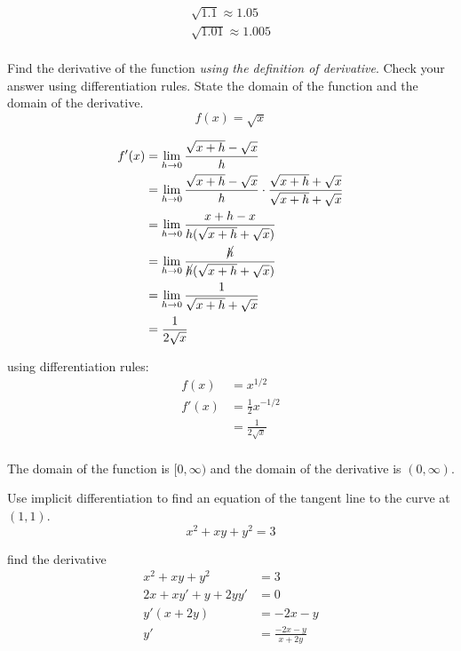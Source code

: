 \documentclass[fleqn,addpoints]{exam}
\begin{document}
\begin{questions}
\begin{solution}
\begin{align*}
  \sqrt{1.1} \approx 1.05 \\
  \sqrt{1.01} \approx 1.005 \\
\end{align*}

\end{solution}

\ifprintanswers
\pagebreak
\fi

\question Find the derivative of the function {\em using the definition of derivative}. Check your answer using
differentiation rules. State the domain of the function and the domain of the derivative.
\[
  f(x) = \sqrt{x}
\]

\begin{solution}
\begin{align*}
  f'(x) &= \lim_{h \to 0} \frac{\sqrt{x + h} - \sqrt{x}}{h} \\
        &= \lim_{h \to 0} \frac{\sqrt{x + h} - \sqrt{x}}{h} \cdot \frac{\sqrt{x + h} + \sqrt{x}}{\sqrt{x + h} + \sqrt{x}} \\
        &= \lim_{h \to 0} \frac{x + h - x}{h (\sqrt{x + h} + \sqrt{x})} \\
        &= \lim_{h \to 0} \frac{\cancel{h}}{\cancel{h} (\sqrt{x + h} + \sqrt{x})} \\
        &= \lim_{h \to 0} \frac{1}{\sqrt{x + h} + \sqrt{x}} \\
        &= \frac{1}{2 \sqrt{x}} \\
\end{align*}

using differentiation rules:
\begin{align*}
  f(x) &= x^{1/2} \\
  f'(x) &= \frac{1}{2} x^{-1/2} \\
        &= \frac{1}{2 \sqrt{x}} \\
\end{align*}

The domain of the function is $[0, \infty)$ and the domain of the derivative is $(0, \infty)$.

\end{solution}

\ifprintanswers
\pagebreak
\fi

\question Use implicit differentiation to find an equation of the tangent line to the curve at $(1, 1)$.
\[
  x^2 + xy + y^2 = 3
\]
\begin{solution}
find the derivative
\begin{align*}
  x^2 + xy + y^2 &= 3 \\
  2x + xy' + y + 2yy' &= 0 \\
  y'(x + 2y) &= -2x - y \\
  y' &= \frac{-2x - y}{x + 2y} \\
\end{align*}


\end{solution}
\end{questions}
\end{document}
